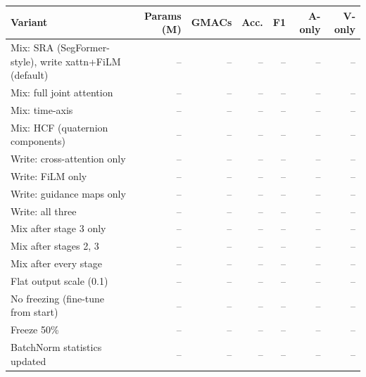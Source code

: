 \begin{tabular}{lrrrrrr}
\toprule
Variant & Params (M) & GMACs & Acc. & F1 & A-only & V-only \\
\midrule
Mix: SRA (SegFormer-style), write xattn+FiLM (default) & -- & -- & -- & -- & -- & -- \\
Mix: full joint attention & -- & -- & -- & -- & -- & -- \\
Mix: time-axis & -- & -- & -- & -- & -- & -- \\
Mix: HCF (quaternion components) & -- & -- & -- & -- & -- & -- \\
\midrule
Write: cross-attention only & -- & -- & -- & -- & -- & -- \\
Write: FiLM only & -- & -- & -- & -- & -- & -- \\
Write: guidance maps only & -- & -- & -- & -- & -- & -- \\
Write: all three & -- & -- & -- & -- & -- & -- \\
\midrule
Mix after stage 3 only & -- & -- & -- & -- & -- & -- \\
Mix after stages 2, 3 & -- & -- & -- & -- & -- & -- \\
Mix after every stage & -- & -- & -- & -- & -- & -- \\
\midrule
Flat output scale (0.1) & -- & -- & -- & -- & -- & -- \\
No freezing (fine-tune from start) & -- & -- & -- & -- & -- & -- \\
Freeze 50\% & -- & -- & -- & -- & -- & -- \\
BatchNorm statistics updated & -- & -- & -- & -- & -- & -- \\
\bottomrule
\end{tabular}
